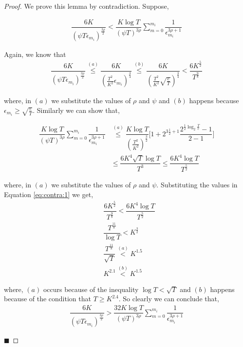 \begin{proof}
We prove this lemma by contradiction. Suppose,

\begin{align}
\dfrac{6K}{(\psi T \epsilon_{m_i})^{\frac{3\rho}{2}}} < \dfrac{K\log T}{(\psi T)^{3\rho}}\sum_{m=0}^{m_i}\dfrac{1}{\epsilon_{m_i}^{3\rho + 1}} \label{eq:contra:1}
\end{align}

Again, we know that 
\begin{align*}
\dfrac{6K}{(\psi T \epsilon_{m_i})^{\frac{3\rho}{2}}} \overset{(a)}{\leq} \dfrac{6K}{( \frac{T^2}{K^2} \epsilon_{m_i})^{\frac{3}{4}}} \overset{(b)}{\leq} \dfrac{6K}{( \frac{T^2}{K^2} \sqrt{\frac{e}{T}})^{\frac{3}{4}}}
< \dfrac{6K^{\frac{5}{2}}}{T^{\frac{9}{8}}}
\end{align*}

where, in $(a)$ we substitute the values of $\rho$ and $\psi$ and $(b)$ happens because $\epsilon_{m_i} \geq \sqrt{\frac{e}{T}}$. Similarly we can show that,

\begin{align*}
\dfrac{K\log T}{(\psi T)^{3\rho}}\sum_{m=0}^{m_i}\dfrac{1}{\epsilon_{m_i}^{3\rho + 1}} &\overset{(a)}{\leq} 
\dfrac{K\log T}{(\frac{T^2}{K^2})^{\frac{3}{2}}}\bigg[ 1 + 2^{3\frac{1}{2} + 1}\dfrac{2^{ \frac{1}{2}\log_{2} \frac{T}{e}}-1}{2-1} \bigg] \\
&\leq \dfrac{6 K^4\sqrt{T}\log T}{T^3} \leq \dfrac{6 K^4\log T}{T^{\frac{5}{2}}}
\end{align*}

where, in $(a)$ we substitute the values of $\rho$ and $\psi$. Substituting the values in Equation \ref{eq:contra:1} we get,
\begin{align*}
& \dfrac{6K^{\frac{5}{2}}}{T^{\frac{9}{8}}} < \dfrac{6K^4\log T}{T^{\frac{5}{2}}}\\
& \dfrac{T^{\frac{11}{8}}}{\log T} < K^{\frac{3}{2}}\\
& \dfrac{T^{\frac{11}{8}}}{\sqrt{T}} \overset{(a)}{<} K^{1.5}\\
& K^{2.1} \overset{(b)}{<} K^{1.5}
\end{align*}

where, $(a)$ occurs because of the inequality $\log T < \sqrt{T}$ and $(b)$ happens because of the condition that $T\geq K^{2.4}$. So clearly we can conclude that,
\begin{align*}
\dfrac{6K}{(\psi T \epsilon_{m_i})^{\frac{3\rho}{2}}} > \dfrac{32K\log T}{(\psi T)^{3\rho}}\sum_{m=0}^{m_i}\dfrac{1}{\epsilon_{m_i}^{3\rho + 1}}
\end{align*}

\hfill $\blacksquare$	
\end{proof}

